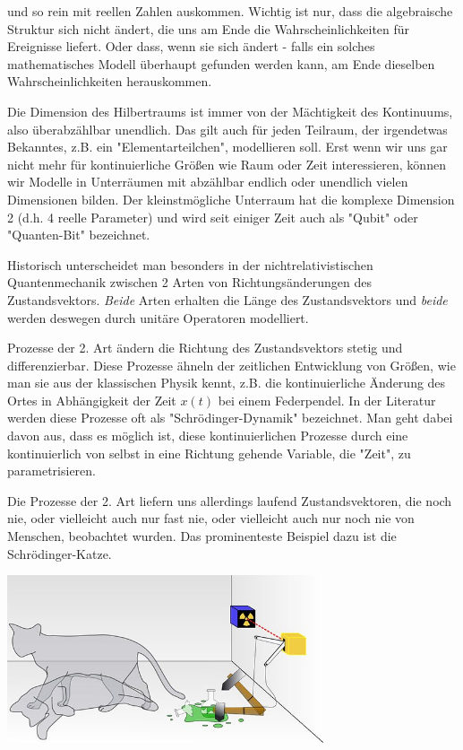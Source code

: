 \documentclass[12pt]{book}
\begin{document}
und so rein mit reellen Zahlen auskommen. Wichtig ist nur, dass die algebraische Struktur sich nicht ändert, die uns am Ende die Wahrscheinlichkeiten für Ereignisse liefert. Oder dass, wenn sie sich ändert - falls ein solches mathematisches Modell überhaupt gefunden werden kann, am Ende dieselben Wahrscheinlichkeiten herauskommen. 

Die Dimension des Hilbertraums ist immer von der Mächtigkeit des Kontinuums, also überabzählbar unendlich. Das gilt auch für jeden Teilraum, der irgendetwas Bekanntes, z.B. ein "Elementarteilchen", modellieren soll. Erst wenn wir uns gar nicht mehr für  kontinuierliche Größen wie Raum oder Zeit interessieren, können wir Modelle in Unterräumen mit abzählbar endlich oder unendlich vielen Dimensionen bilden. Der kleinstmögliche Unterraum hat die komplexe Dimension 2 (d.h. 4 reelle Parameter) und wird seit einiger Zeit auch als "Qubit" oder "Quanten-Bit" bezeichnet. 

Historisch unterscheidet man besonders in der nichtrelativistischen Quantenmechanik zwischen 2 Arten von Richtungsänderungen des Zustandsvektors. \emph{Beide} Arten erhalten die Länge des Zustandsvektors und \emph{beide} werden deswegen durch unitäre Operatoren modelliert.

Prozesse der 2. Art ändern die Richtung des Zustandsvektors stetig und differenzierbar. Diese Prozesse ähneln der zeitlichen Entwicklung von Größen, wie man sie aus der klassischen Physik kennt, z.B. die kontinuierliche Änderung des Ortes in Abhängigkeit der Zeit $x(t)$ bei einem Federpendel. In der Literatur werden diese Prozesse oft als "Schrödinger-Dynamik" bezeichnet. Man geht dabei davon aus, dass es möglich ist, diese kontinuierlichen Prozesse durch eine kontinuierlich von selbst in eine Richtung gehende Variable, die "Zeit", zu parametrisieren. 

Die Prozesse der 2. Art liefern uns allerdings laufend Zustandsvektoren, die noch nie, oder vielleicht auch nur fast nie, oder vielleicht auch nur noch nie von Menschen, beobachtet wurden. Das prominenteste Beispiel dazu ist die Schrödinger-Katze.

\begin{center}
\includegraphics[width=0.7\textwidth]{Bilder/Katze.jpg}
\end{center}
\end{document}
